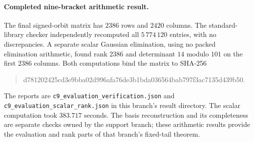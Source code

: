 \paragraph{Completed nine-bracket arithmetic result.}
The final signed-orbit matrix has $2386$ rows and $2420$ columns.
The standard-library checker independently recomputed all
$5\,774\,120$ entries, with no discrepancies.  A separate scalar
Gaussian elimination, using no packed elimination arithmetic, found
rank $2386$ and determinant $14$ modulo $101$ on the first $2386$
columns.  Both computations bind the matrix to SHA-256
\begin{quote}\ttfamily\small
d781202425cd3e9bba02d996afa76de3b1bda036564bab797f3ac7135d439b50.
\end{quote}
The reports are \texttt{c9\_evaluation\_verification.json} and
\texttt{c9\_evaluation\_scalar\_rank.json} in this branch's result
directory.  The scalar computation took $383.717$ seconds.
The basis reconstruction and its completeness are separate checks
owned by the support branch; these arithmetic results provide the
evaluation and rank parts of that branch's fixed-tail theorem.
